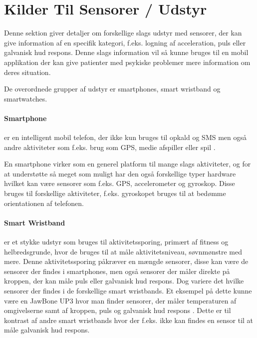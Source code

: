 \section{Kilder Til Sensorer / Udstyr}\label{sec:kilder-til-sensorer}
Denne sektion giver detaljer om forskellige slags udstyr med sensorer, der kan give information af en specifik kategori, f.eks. logning af acceleration, puls eller galvanisk hud respons.
Denne slags information vil så kunne bruges til en mobil applikation der kan give patienter med psykiske problemer mere information om deres situation.

De overordnede grupper af udstyr er smartphones, smart wristband og smartwatches. 

\paragraph{Smartphone}
 er en intelligent mobil telefon, der ikke kun bruges til opkald og SMS men også andre aktiviteter som f.eks. brug som GPS, medie afspiller eller spil \citep{misc:smartphone}.

En smartphone virker som en generel platform til mange slags aktiviteter, og for at understøtte så meget som muligt har den også forskellige typer hardware hvilket kan være sensorer som f.eks. GPS, accelerometer og gyroskop. Disse bruges til forskellige aktiviteter, f.eks. gyroskopet bruges til at bedømme orientationen af telefonen. 

\paragraph{Smart Wristband} %
 er et stykke udstyr som bruges til aktivitetssporing, primært af fitness og helbredsgrunde, hvor de bruges til at måle aktivitetsniveau, søvnmønstre med mere.
Denne aktivitetssporing påkræver en mængde sensorer, disse kan være de sensorer der findes i smartphones, men også sensorer der måler direkte på kroppen, der kan måle puls eller galvanisk hud respons. 
Dog variere det hvilke sensorer der findes i de forskellige smart wristbands.
Et eksempel på dette kunne være en JawBone UP3 hvor man finder sensorer, der måler temperaturen af omgivelserne samt af kroppen, puls og galvanisk hud respons \citep{misc:jawboneup3sensors}. 
Dette er til kontrast af andre smart wristbands hvor der f.eks. ikke kan findes en sensor til at måle galvanisk hud respons.


